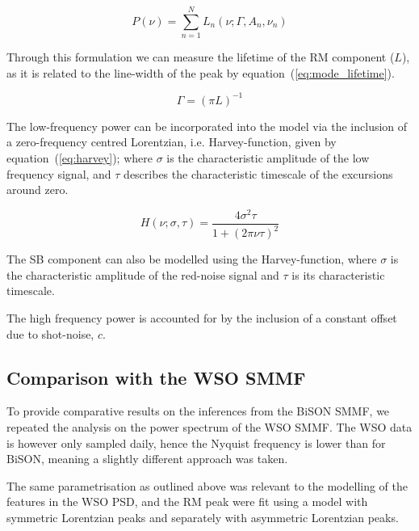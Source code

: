 \begin{equation}
P(\nu) = \sum_{n=1}^{N} L_n(\nu; \Gamma, A_n, \nu_n)
\label{eq:lorentzian_fit}
\end{equation}


Through this formulation we can measure the lifetime of the RM component ($L$), as it is related to the line-width of the peak by equation~(\ref{eq:mode_lifetime}).

\begin{equation}
\Gamma  = (\pi L)^{-1}
\label{eq:mode_lifetime}
\end{equation}


The low-frequency power can be incorporated into the model via the inclusion of a zero-frequency centred Lorentzian, i.e. Harvey-function, given by equation~(\ref{eq:harvey}); where $\sigma$ is the characteristic amplitude of the low frequency signal, and $\tau$ describes the characteristic timescale of the excursions around zero.

\begin{equation}
H(\nu; \sigma, \tau) = \frac{4{\sigma}^2\tau}{1 + (2\pi \nu\tau)^2}
\label{eq:harvey}
\end{equation}

The SB component can also be modelled using the Harvey-function, where $\sigma$ is the characteristic amplitude of the red-noise signal and $\tau$ is its characteristic timescale.

The high frequency power is accounted for by the inclusion of a constant offset due to shot-noise, $c$.


\subsection{Comparison with the WSO SMMF}

To provide comparative results on the inferences from the BiSON SMMF, we repeated the analysis on the power spectrum of the WSO SMMF. The WSO data is however only sampled daily, hence the Nyquist frequency is lower than for BiSON, meaning a slightly different approach was taken.

The same parametrisation as outlined above was relevant to the modelling of the features in the WSO PSD, and the RM peak were fit using a model with symmetric Lorentzian peaks and separately with asymmetric Lorentzian peaks.


